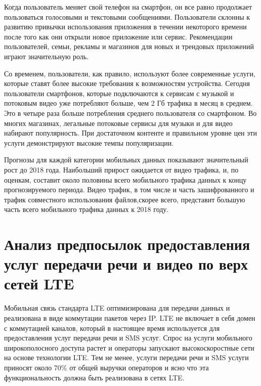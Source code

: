 Когда пользователь меняет свой телефон на смартфон, он все равно продолжает пользоваться голосовыми и текстовыми сообщениями. Пользователи склонны к развитию привычки использования приложения в течении некоторого времени после того как они открыли новое приложение или сервис. Рекомендации пользователей, семьи, рекламы и магазинов для новых и трендовых приложений играют значительную роль. 

Со временем, пользователи, как правило, используют более современные услуги, которые ставят более высокие требования к возможностям устройства. Сегодня пользователи смартфонов, которые подключаются к сервисам с музыкой и потоковым видео уже потребляют больше, чем 2 Гб трафика в месяц в среднем. Это в четыре раза больше потребления среднего пользователя со смартфоном. Во многих магазинах, легальные потоковые сервисы для музыки и для видео набирают популярность. При достаточном контенте и правильном уровне цен эти услуги демонстрируют высокие темпы популяризации.

Прогнозы для каждой категории мобильных данных показывают значительный рост до 2018 года. Наибольший прирост ожидается от видео трафика, и, по оценкам, составит около половины всего мобильного трафика данных к концу прогнозируемого периода. Видео трафик, в том числе и часть зашифрованного и трафик совместного использования файлов,скорее всего, представит большую часть всего мобильного трафика данных к 2018 году.


















\section{Анализ предпосылок предоставления услуг передачи речи и видео по верх сетей LTE} \label{sect1_4}



Мобильная связь стандарта LTE оптимизирована для передачи данных и реализована в виде коммутации пакетов через IP. LTE не включает в себя домен с коммутацией каналов, который в настоящее время используется для предоставления услуг передачи речи и SMS услуг. Спрос на услуги мобильного широкополосного доступа растет и операторы запускают высокоскоростные сети на основе технологии LTE. Тем не менее, услуги передачи речи и SMS услуги приносят около 70\% от общей выручки операторов и ясно что эта функциональность должна быть реализована в сетях LTE.

